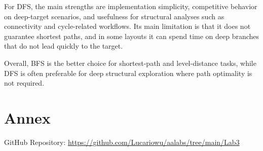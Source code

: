 \documentclass{labreport}
\begin{document}
For DFS, the main strengths are implementation simplicity, competitive behavior on deep-target scenarios, and usefulness for structural analyses such as connectivity and cycle-related workflows. Its main limitation is that it does not guarantee shortest paths, and in some layouts it can spend time on deep branches that do not lead quickly to the target.

Overall, BFS is the better choice for shortest-path and level-distance tasks, while DFS is often preferable for deep structural exploration where path optimality is not required.

\newpage
\section{Annex}

GitHub Repository: \url{https://github.com/Lucariowu/aalabs/tree/main/Lab3}
\end{document}

